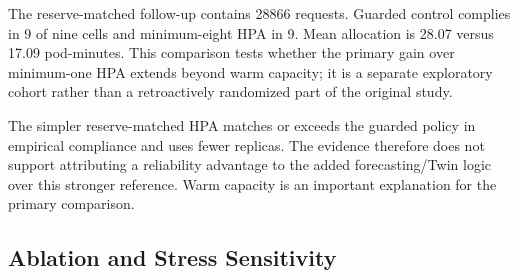 \documentclass[10pt,twocolumn,a4paper]{article}
\begin{document}
\begin{table}[t]\centering\small\setlength{\tabcolsep}{3pt}
\caption{Separate exploratory cohort with both adaptive policies initialized at eight and constrained to the same minimum eight and maximum sixteen. Three fresh paired repeats per workload; the frozen primary cohort is unchanged.}\label{tab:reserve_hpa}
\ifdim\wd\databox>\textwidth\relax\resizebox{\textwidth}{!}{\usebox{\databox}}\else\usebox{\databox}\fi
\end{table}

The reserve-matched follow-up contains 28866 requests. Guarded control complies in 9 of nine cells and minimum-eight HPA in 9. Mean allocation is 28.07 versus 17.09 pod-minutes. This comparison tests whether the primary gain over minimum-one HPA extends beyond warm capacity; it is a separate exploratory cohort rather than a retroactively randomized part of the original study.

The simpler reserve-matched HPA matches or exceeds the guarded policy in empirical compliance and uses fewer replicas. The evidence therefore does not support attributing a reliability advantage to the added forecasting/Twin logic over this stronger reference. Warm capacity is an important explanation for the primary comparison.

\subsection{Ablation and Stress Sensitivity}

\begin{table}[t]\centering\small\setlength{\tabcolsep}{3pt}
\caption{Live reserve ablation: guarded minus otherwise identical policy without the eight-replica floor. Both begin with eight ready replicas.}\label{tab:ablation}
\ifdim\wd\databox>\columnwidth\relax\resizebox{\columnwidth}{!}{\usebox{\databox}}\else\usebox{\databox}\fi
\end{table}
\end{document}
